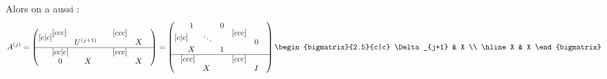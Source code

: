 \begin{preuve}
    Alors on a aussi :
    \[
        A^{(j)} =
        \begin{pmatrix}[c|c]
            \begin{matrix}[ccc]
                \\
                & U^{(j+1)} & \\
            \end{matrix}
            &
            \begin{matrix}[ccc]
                \\
                & X & \\
            \end{matrix}
            \\ \hline
            \begin{matrix}[cc|c]
               \\
               0 & & X \\
            \end{matrix}
            &
            \begin{matrix}[ccc]
                \\
                & X & \\
            \end{matrix}
        \end{pmatrix}
        =
        \begin{pmatrix}[c|c]
            \begin{matrix}
                1 & & 0 \\
                & \ddots & \\
                X & & 1
            \end{matrix}
            & \begin{matrix}[ccc]\\ & 0 & \\ \end{matrix}
            \\ \hline
            \begin{matrix}[ccc]\\ & X & \\ \end{matrix}
            & \begin{matrix}[ccc]\\ & I & \\ \end{matrix}
        \end{pmatrix}
        \begin{bigmatrix}{2.5}{c|c}
            \Delta_{j+1} & X \\
            \hline
            X & X
        \end{bigmatrix}
    \]


\end{preuve}
